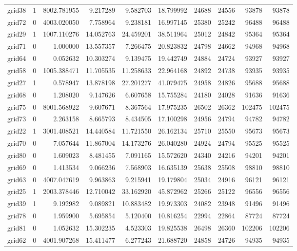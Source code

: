 \begin{longtable}{|l|r|r|r|r|r|r|r|r|r|}
grid38 & 1 & 8002.781955 & 9.217289 & 9.582703 & 18.799992 & 24688 & 24556 & 93878 & 93878 \\
grid72 & 0 & 4003.020050 & 7.758964 & 9.238181 & 16.997145 & 25380 & 25242 & 96488 & 96488 \\
grid29 & 1 & 1007.110276 & 14.052763 & 24.459201 & 38.511964 & 25012 & 24842 & 95364 & 95364 \\
grid71 & 0 & 1.000000 & 13.557357 & 7.266475 & 20.823832 & 24798 & 24662 & 94968 & 94968 \\
grid64 & 0 & 0.052632 & 10.303274 & 9.139475 & 19.442749 & 24884 & 24724 & 93927 & 93927 \\
grid58 & 0 & 1005.388471 & 11.705535 & 11.258633 & 22.964168 & 24892 & 24738 & 93935 & 93935 \\
grid27 & 1 & 0.578947 & 13.878198 & 27.201277 & 41.079475 & 24958 & 24826 & 95688 & 95688 \\
grid68 & 0 & 1.208020 & 9.147626 & 6.607658 & 15.755284 & 24180 & 24028 & 91636 & 91636 \\
grid75 & 0 & 8001.568922 & 9.607671 & 8.367564 & 17.975235 & 26502 & 26362 & 102475 & 102475 \\
grid73 & 0 & 2.263158 & 8.665793 & 8.434505 & 17.100298 & 24956 & 24794 & 94782 & 94782 \\
grid22 & 1 & 3001.408521 & 14.440584 & 11.721550 & 26.162134 & 25710 & 25550 & 95673 & 95673 \\
grid70 & 0 & 7.057644 & 11.867004 & 14.173276 & 26.040280 & 24924 & 24794 & 95525 & 95525 \\
grid80 & 0 & 1.609023 & 8.481455 & 7.091165 & 15.572620 & 24340 & 24216 & 94201 & 94201 \\
grid69 & 0 & 1.413534 & 9.066236 & 7.568903 & 16.635139 & 25638 & 25508 & 98810 & 98810 \\
grid63 & 0 & 4007.047619 & 9.963863 & 9.215941 & 19.179804 & 25034 & 24916 & 96121 & 96121 \\
grid25 & 1 & 2003.378446 & 12.710042 & 33.162920 & 45.872962 & 25266 & 25122 & 96556 & 96556 \\
grid39 & 1 & 9.192982 & 9.089821 & 10.883482 & 19.973303 & 24082 & 23948 & 91496 & 91496 \\
grid78 & 0 & 1.959900 & 5.695854 & 5.120400 & 10.816254 & 22994 & 22864 & 87724 & 87724 \\
grid81 & 0 & 1.052632 & 15.302235 & 4.523303 & 19.825538 & 26498 & 26360 & 102206 & 102206 \\
grid62 & 0 & 4001.907268 & 15.411477 & 6.277243 & 21.688720 & 24858 & 24726 & 94935 & 94935 \\

\end{longtable}
